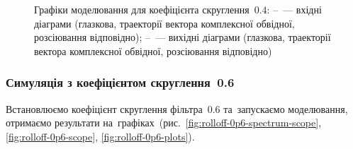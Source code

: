 \documentclass[
	a4paper,
	oneside,
	BCOR = 10mm,
	DIV = 12,
	12pt,
	headings = normal,
]{scrartcl}
\begin{document}
\begin{figure}[!htbp]
\begin{subfigure}{\textwidth / 3}
						\caption{}
						\label{subfig:rolloff-0p4-scatter-plot-out}
					\end{subfigure}%
					\caption{Графіки моделювання для коефіцієнта скруглення~$0.4$: –~— вхідні діаграми (глазкова, траекторії вектора комплексної обвідної, розсіювання відповідно); –~— вихідні діаграми (глазкова, траекторії вектора комплексної обвідної, розсіювання відповідно)}
					\label{fig:rolloff-0p4-plots}
				\end{figure}

			\clearpage
			\subsubsection{Симуляція з коефіцієнтом скруглення~0.6}
				Встановлюємо коефіцієнт скруглення фільтра~$0.6$ та~запускаємо моделювання, отримаємо результати на~графіках~(рис.~\ref{fig:rolloff-0p6-spectrum-scope}, \ref{fig:rolloff-0p6-scope}, \ref{fig:rolloff-0p6-plots}).
\end{document}
